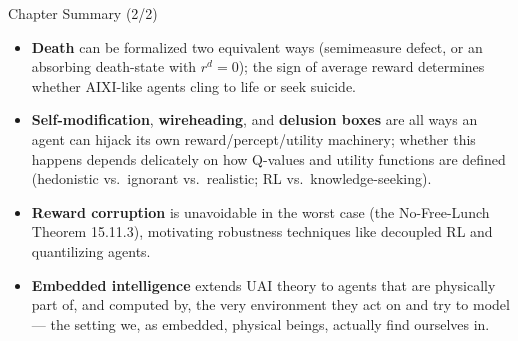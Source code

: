 \documentclass[aspectratio=169,10pt]{beamer}
\begin{document}
\begin{frame}{Chapter Summary (2/2)}
  \begin{itemize}
    \item \textbf{Death} can be formalized two equivalent ways
      (semimeasure defect, or an absorbing death-state with $r^d=0$); the
      sign of average reward determines whether AIXI-like agents cling to
      life or seek suicide.
    \item \textbf{Self-modification}, \textbf{wireheading}, and
      \textbf{delusion boxes} are all ways an agent can hijack its own
      reward/percept/utility machinery; whether this happens depends
      delicately on how Q-values and utility functions are defined
      (hedonistic vs.\ ignorant vs.\ realistic; RL vs.\ knowledge-seeking).
    \item \textbf{Reward corruption} is unavoidable in the worst case (the
      No-Free-Lunch Theorem 15.11.3), motivating robustness techniques
      like decoupled RL and quantilizing agents.
    \item \textbf{Embedded intelligence} extends UAI theory to agents that
      are physically part of, and computed by, the very environment they
      act on and try to model --- the setting we, as embedded, physical
      beings, actually find ourselves in.
  \end{itemize}
\end{frame}
\end{document}
